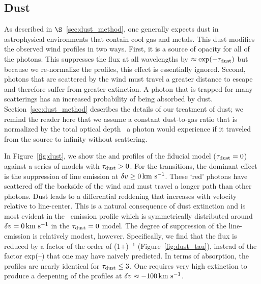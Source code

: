\documentclass[12pt,preprint]{aastex}
\begin{document}
\subsection{Dust}
\label{sec:dust}

As described in $\S$~\ref{sec:dust_method}, 
one generally expects dust in astrophysical environments that contain
cool gas and metals.  This dust 
modifies the observed wind profiles in two ways. 
First, it is a source of opacity for all of 
the photons.  This suppresses the flux at all
wavelengths by $\approx \exp(-\tau_{\rm dust})$ but because we re-normalize the
profiles, this effect is essentially ignored.  Second, photons that are
scattered by the wind must travel a greater
distance to escape and therefore suffer from greater extinction.  A photon that is
trapped for many scatterings %
has an increased 
probability of being absorbed
by dust.  
Section~\ref{sec:dust_method} describes the details of our treatment of dust; we 
remind the reader here that we assume a constant dust-to-gas ratio 
that is normalized by the total optical
depth \taud\ a photon would experience if it traveled from the
source to infinity without scattering. 

In Figure~\ref{fig:dust}, we show the  and 
profiles of the fiducial model ($\tau_{\rm dust} = 0$) against a series of
models with $\tau_{\rm dust} > 0$.  For the  transitions, the
dominant effect is the suppression of line emission at $\delta v \ge 0
\, {\rm km~s^{-1}}$.  These `red' photons have scattered off the
backside of the wind and must travel a longer path than other
photons.  Dust leads to a differential reddening that increases with 
velocity relative to line-center. This is a natural consequence of dust
extinction and is most evident in the \feiic\ 
emission profile which is symmetrically distributed around
$\delta v= 0 \, {\rm km~s^{-1}}$ in the $\tau_{\rm dust}=0$ model.   
The degree of suppression of the line-emission is relatively modest,
however.  Specifically, we find that the flux is reduced by a factor 
of the order of (1+\taud)$^{-1}$ (Figure~\ref{fig:dust_tau}),
instead of the factor
exp(--\taud) that one may have naively predicted. 
In terms of absorption, the profiles are
nearly identical for $\tau_{\rm dust} \le 3$.  One requires very high
extinction to %
produce a deepening of the profiles at 
$\delta v \approx -100 \, {\rm km~s^{-1}}$.
\end{document}
